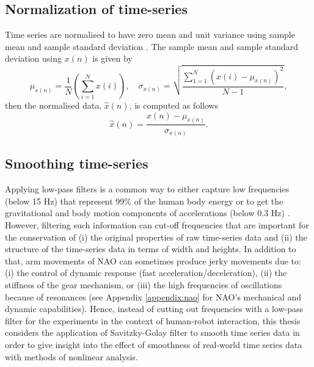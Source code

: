 \subsection{Normalization of time-series}
Time series are normalised to have zero mean and unit variance 
using sample mean and sample standard deviation \citep{loffe2015}.
The sample mean and sample standard deviation using $x(n)$ is given by
\begin{equation}\label{eq:ms}
\mu_{x(n)}= 
	\frac{1}{N} ( \sum_{i=1}^N x(i) ), \quad  
	\sigma_{x(n)} =  
	\sqrt{ \frac{  \sum_{1=1}^N ( x(i) - \mu_{x(n)} )^2 }{ N-1 }  },      
\end{equation}
then the normalised data, $\hat{x}(n)$, is computed as follows
\begin{equation}\label{eq:normalization}
\hat{x} (n) = \frac{   x(n) -  \mu_{x(n)}  }{   \sigma_{x(n)} }.   
\end{equation}

\subsection{Smoothing time-series}
Applying low-pass filters is a common way to either capture low 
frequencies (below 15 Hz) that represent 99\% of the human body 
energy or to get the gravitational and body motion components of 
accelerations (below 0.3 Hz) \citep{anguita2013}.
However, filtering such information can cut-off frequencies that 
are important for the conservation of  
(i) the original properties of raw time-series data and 
(ii) the structure of the time-series data in terms of width and heights.
In addition to that, arm movements of NAO can sometimes produce 
jerky movements due to: 
(i) the control of dynamic response (fast acceleration/deceleration), 
(ii) the stiffness of the gear mechanism, or 
(iii) the high frequencies of oscillations because of resonances
(see Appendix \ref{appendix:nao} for NAO's mechanical and dynamic 
capabilities). 
Hence, instead of cutting out frequencies with a low-pass filter
for the experiments in the context of human-robot interaction, 
this thesis considers the application of Savitzky-Golay filter 
to smooth time series data in order 
to give insight into the effect of smoothness of real-world 
time series data with methods of nonlinear analysis.

